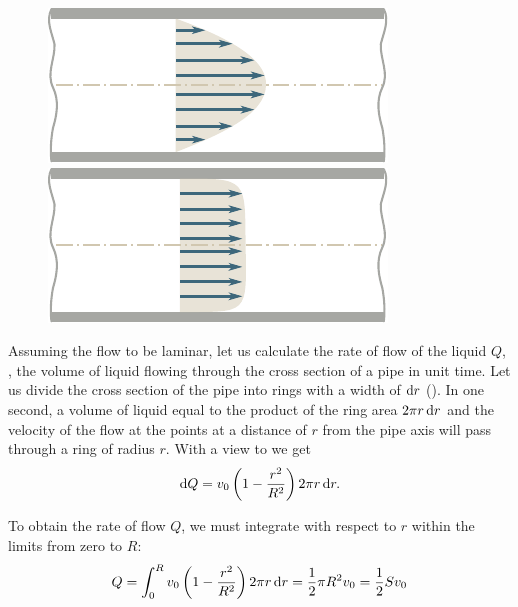 \begin{figure}[t]
	\begin{minipage}[t]{0.5\linewidth}
		\begin{center}
			\includegraphics[scale=1.0]{figures/ch_09/fig_9_11.pdf}
			\caption[]{}
			\label{fig:9_11}
		\end{center}
	\end{minipage}
	\hspace{-0.0cm}
	\begin{minipage}[t]{0.5\linewidth}
		\begin{center}
			\includegraphics[scale=1.0]{figures/ch_09/fig_9_12.pdf}
			\caption[]{}
			\label{fig:9_12}
		\end{center}
	\end{minipage}
	\vspace{-0.4cm}
\end{figure}

Assuming the flow to be laminar, let us calculate the rate of flow of the liquid $Q$, \ie, the volume of liquid flowing through the cross section of a pipe in unit time. Let us divide the cross section of the pipe into rings with a width of $\mathrm{d} r$ (). In one second, a volume of liquid equal to the product of the ring area $2\pi r\,\mathrm{d} r$ and the velocity of the flow at the points at a distance of $r$  from the pipe axis will pass through a ring of radius $r$. With a view to  we get
\begin{equation}\label{eq:9_21}
	\mathrm{d} Q = v_0 \left(1 - \frac{r^2}{R^2}\right) 2\pi r\,\mathrm{d} r.
\end{equation}

\noindent
To obtain the rate of flow $Q$, we must integrate  with respect to $r$ within the limits from zero to $R$:
\begin{equation}\label{eq:9_22}
	Q = \int_{0}^{R} v_0 \left(1 - \frac{r^2}{R^2}\right) 2\pi r\,\mathrm{d} r = \frac{1}{2}\pi R^2 v_0 = \frac{1}{2}Sv_0
\end{equation}

